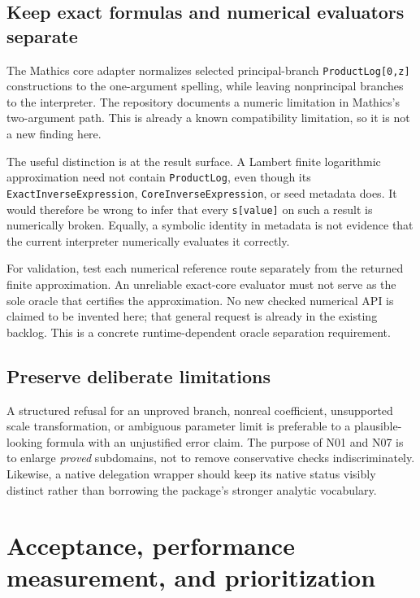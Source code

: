 \documentclass[11pt,letterpaper]{article}
\newcommand{\code}[1]{\nolinkurl{#1}}
\begin{document}
\subsection{Keep exact formulas and numerical evaluators separate}
The Mathics core adapter normalizes selected principal-branch
\code{ProductLog[0,z]} constructions to the one-argument spelling, while
leaving nonprincipal branches to the interpreter. The repository documents
a numeric limitation in Mathics's two-argument path. This is already a known
compatibility limitation, so it is not a new finding here.
\cite{repo-mcore,repo-mathics}

The useful distinction is at the result surface. A Lambert finite logarithmic
approximation need not contain \code{ProductLog}, even though its
\code{ExactInverseExpression}, \code{CoreInverseExpression}, or seed metadata
does. It would therefore be wrong to infer that every \code{s[value]} on such
a result is numerically broken. Equally, a symbolic identity in metadata is
not evidence that the current interpreter numerically evaluates it correctly.
\cite{repo-lambert}

For validation, test each numerical reference route separately from the
returned finite approximation. An unreliable exact-core evaluator must not
serve as the sole oracle that certifies the approximation. No new checked
numerical API is claimed to be invented here; that general request is already
in the existing backlog. This is a concrete runtime-dependent oracle
separation requirement.

\subsection{Preserve deliberate limitations}
A structured refusal for an unproved branch, nonreal coefficient, unsupported
scale transformation, or ambiguous parameter limit is preferable to a
plausible-looking formula with an unjustified error claim. The purpose of
N01 and N07 is to enlarge \emph{proved} subdomains, not to remove conservative
checks indiscriminately. Likewise, a native delegation wrapper should keep
its native status visibly distinct rather than borrowing the package's
stronger analytic vocabulary.

\section{Acceptance, performance measurement, and prioritization}
\label{sec:acceptance}
\end{document}

